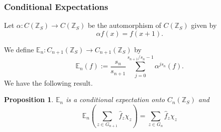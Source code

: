 \documentclass[12pt,reqno]{amsart}
\numberwithin{equation}{section}
\newcommand{\E}{{\mathbb E}}
\newcommand{\Z}{{\mathbb Z}}
\newtheorem{prop}[theo]{{\sc \bf Proposition}}
\begin{document}
\subsubsection{Conditional Expectations}

Let $\alpha: C(\Z_S)\to C(\Z_S)$ be the automorphism of $C(\Z_S)$ given by 
$$\alpha f(x)=f(x+1).$$

We define $\E_n:C_{n+1}(\Z_S)\to C_{n+1}(\Z_S)$ by
\begin{equation*}
\E_n(f):=\frac{s_n}{s_{n+1}}\sum_{j=0}^{s_{n+1}/s_n-1}\alpha^{js_n}(f).
\end{equation*}
We have the following result.
\begin{prop}\label{cond_exp_cont} $\E_n$ is a conditional expectation onto $C_{n}(\Z_S)$ and
\begin{equation}\label{odoexp}
\E_n\left(\sum_{z\in G_{n+1}}\hat f_z \chi_z\right)=\sum_{z\in G_{n}}\hat f_z \chi_z
\end{equation}

\end{prop}
\end{document}
